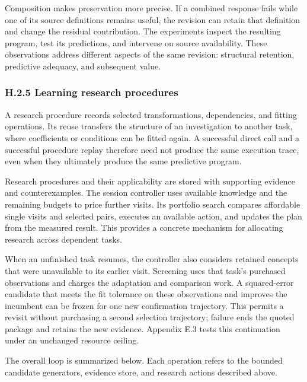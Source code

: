\documentclass[11pt,a4paper]{article}
\begin{document}
Composition makes preservation more precise. If a combined response fails while one of its source definitions remains useful, the revision can retain that definition and change the residual contribution. The experiments inspect the resulting program, test its predictions, and intervene on source availability. These observations address different aspects of the same revision: structural retention, predictive adequacy, and subsequent value.


\subsubsection*{H.2.5 Learning research procedures}

A research procedure records selected transformations, dependencies, and fitting operations. Its reuse transfers the structure of an investigation to another task, where coefficients or conditions can be fitted again. A successful direct call and a successful procedure replay therefore need not produce the same execution trace, even when they ultimately produce the same predictive program.


Research procedures and their applicability are stored with supporting evidence and counterexamples. The session controller uses available knowledge and the remaining budgets to price further visits. Its portfolio search compares affordable single visits and selected pairs, executes an available action, and updates the plan from the measured result. This provides a concrete mechanism for allocating research across dependent tasks.


When an unfinished task resumes, the controller also considers retained concepts
that were unavailable to its earlier visit. Screening uses that task's purchased
observations and charges the adaptation and comparison work. A squared-error
candidate that meets the fit tolerance on these observations and improves the
incumbent can be frozen for one new confirmation trajectory. This permits a
revisit without purchasing a second selection trajectory; failure ends the quoted
package and retains the new evidence. Appendix E.3 tests this continuation under
an unchanged resource ceiling.


The overall loop is summarized below. Each operation refers to the bounded candidate generators, evidence store, and research actions described above.
\end{document}
